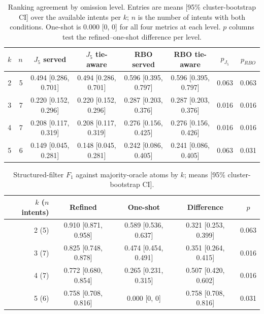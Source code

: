 \documentclass[sigconf,review]{acmart}
\begin{document}
\begin{table}[t]
\caption{Ranking agreement by omission level. Entries are means
[95\% cluster-bootstrap CI] over the available intents per $k$;
$n$ is the number of intents with both conditions. One-shot is
0.000 [0, 0] for all four metrics at each level. $p$ columns test the
refined--one-shot difference per level.}
\label{tab:ranking-k}
\centering\scriptsize\setlength{\tabcolsep}{4pt}
\begin{tabular}{@{}r r c c c c c c@{}}
\toprule
$k$ & $n$ & $J_5$ served & $J_5$ tie-aware & RBO served & RBO tie-aware & $p_{J_5}$ & $p_{RBO}$\\
\midrule
2 & 5 & 0.494 [0.286, 0.701] & 0.494 [0.286, 0.701] & 0.596 [0.395, 0.797] & 0.596 [0.395, 0.797] & 0.063 & 0.063\\
3 & 7 & 0.220 [0.152, 0.296] & 0.220 [0.152, 0.296] & 0.287 [0.203, 0.376] & 0.287 [0.203, 0.376] & 0.016 & 0.016\\
4 & 7 & 0.208 [0.117, 0.319] & 0.208 [0.117, 0.319] & 0.276 [0.156, 0.425] & 0.276 [0.156, 0.426] & 0.016 & 0.016\\
5 & 6 & 0.149 [0.045, 0.281] & 0.148 [0.045, 0.281] & 0.242 [0.086, 0.405] & 0.241 [0.086, 0.405] & 0.063 & 0.031\\
\bottomrule
\end{tabular}
\end{table}

\begin{table}[t]
\caption{Structured-filter $F_1$ against majority-oracle atoms by $k$;
means [95\% cluster-bootstrap CI].}
\label{tab:filter-k}
\centering\scriptsize\setlength{\tabcolsep}{3pt}
\begin{tabular}{@{}r c c c c@{}}
\toprule
$k$ ($n$ intents) & Refined & One-shot & Difference & $p$\\
\midrule
2 (5) & 0.910 [0.871, 0.958] & 0.589 [0.536, 0.637] & 0.321 [0.253, 0.399] & 0.063\\
3 (7) & 0.825 [0.748, 0.878] & 0.474 [0.454, 0.491] & 0.351 [0.264, 0.415] & 0.016\\
4 (7) & 0.772 [0.680, 0.854] & 0.265 [0.231, 0.315] & 0.507 [0.420, 0.602] & 0.016\\
5 (6) & 0.758 [0.708, 0.816] & 0.000 [0, 0] & 0.758 [0.708, 0.816] & 0.031\\
\bottomrule
\end{tabular}
\end{table}
\end{document}
